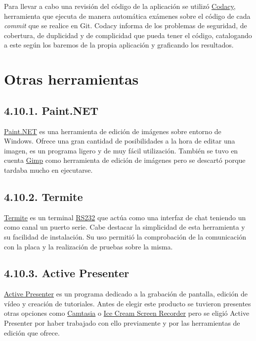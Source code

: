 Para llevar a cabo una revisión del código de la aplicación se utilizó \href{https://www.codacy.com/}{Codacy}, herramienta que ejecuta de manera automática exámenes sobre el código de cada \textit{commit} que se realice en Git. Codacy informa de los problemas de seguridad, de cobertura, de duplicidad y de complicidad que pueda tener el código, catalogando a este según los baremos de la propia aplicación y graficando los resultados.


\section{Otras herramientas}

\subsection{4.10.1. Paint.NET}

\href{https://www.getpaint.net/index.html}{Paint.NET} es una herramienta de edición de imágenes sobre entorno de Windows. Ofrece una gran cantidad de posibilidades a la hora de editar una imagen, es un programa ligero y de muy fácil utilización. También se tuvo en cuenta \href{http://www.gimp.org.es/}{Gimp} como herramienta de edición de imágenes pero se descartó porque tardaba mucho en ejecutarse.

\subsection{4.10.2. Termite}

\href{https://www.compuphase.com/software_termite.htm}{Termite} es un terminal \href{https://es.wikipedia.org/wiki/RS-232}{RS232} que actúa como una interfaz de chat teniendo un como canal un puerto serie. Cabe destacar la simplicidad de esta herramienta y su facilidad de instalación. Su uso permitió la comprobación de la comunicación con la placa y la realización de pruebas sobre la misma.

\subsection{4.10.3. Active Presenter}

\href{https://atomisystems.com/activepresenter/}{Active Presenter} es un programa dedicado a la grabación de pantalla, edición de vídeo y creación de tutoriales. Antes de elegir este producto se tuvieron presentes otras opciones como \href{https://www.techsmith.com/video-editor.html}{Camtasia} o \href{https://icecreamapps.com/Screen-Recorder/}{Ice Cream Screen Recorder} pero se eligió Active Presenter por haber trabajado con ello previamente y por las herramientas de edición que ofrece.

